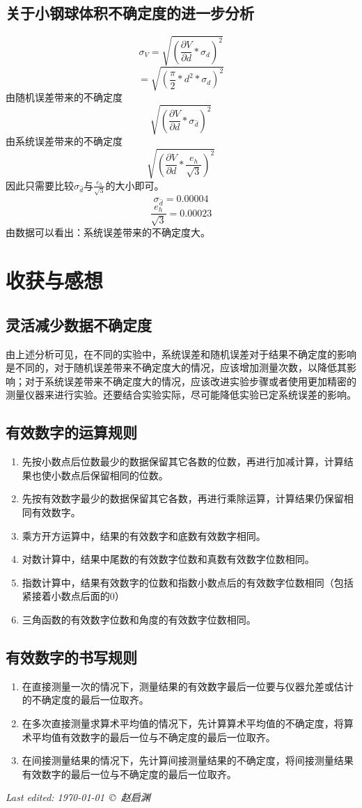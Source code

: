 \documentclass[a4paper,11pt]{article}
\begin{document}
\subsection{关于小钢球体积不确定度的进一步分析}
$$ \sigma_{V} = \sqrt{(\dfrac{\partial V}{\partial d} * \sigma_{d} )^{2} } $$
$$ = \sqrt{(\dfrac{\pi}{2} * d^{2} *\sigma_{d} )^{2} } $$
由随机误差带来的不确定度
$$ \sqrt{(\dfrac{\partial V}{\partial d} * \sigma_{\stackrel{-}{d}})^{2} }  $$
由系统误差带来的不确定度
$$ \sqrt{(\dfrac{\partial V}{\partial d} * \frac{e_{h}}{\sqrt{3}} )^{2} }  $$
因此只需要比较$\sigma_{\stackrel{-}{d}}$与$\frac{e_{h}}{\sqrt{3}}$的大小即可。
$$ \sigma_{\stackrel{-}{d}} = 0.00004 $$
$$ \frac{e_{h}}{\sqrt{3}} = 0.00023 $$
由数据可以看出：系统误差带来的不确定度大。
	
\section{收获与感想}
\subsection{灵活减少数据不确定度}
	由上述分析可见，在不同的实验中，系统误差和随机误差对于结果不确定度的影响是不同的，对于随机误差带来不确定度大的情况，应该增加测量次数，以降低其影响；对于系统误差带来不确定度大的情况，应该改进实验步骤或者使用更加精密的测量仪器来进行实验。还要结合实验实际，尽可能降低实验已定系统误差的影响。
\subsection{有效数字的运算规则}
	\begin{enumerate}
		\item 先按小数点后位数最少的数据保留其它各数的位数，再进行加减计算，计算结果也使小数点后保留相同的位数。
		\item 先按有效数字最少的数据保留其它各数，再进行乘除运算，计算结果仍保留相同有效数字。
		\item 乘方开方运算中，结果的有效数字和底数有效数字相同。
		\item 对数计算中，结果中尾数的有效数字位数和真数有效数字位数相同。
		\item 指数计算中，结果有效数字的位数和指数小数点后的有效数字位数相同（包括紧接着小数点后面的0）
		\item 三角函数的有效数字位数和角度的有效数字位数相同。
	\end{enumerate}

\subsection{有效数字的书写规则}
\begin{enumerate}
	\item 在直接测量一次的情况下，测量结果的有效数字最后一位要与仪器允差或估计的不确定度的最后一位取齐。
	\item 在多次直接测量求算术平均值的情况下，先计算算术平均值的不确定度，将算术平均值有效数字的最后一位与不确定度的最后一位取齐。
	\item 在间接测量结果的情况下，先计算间接测量结果的不确定度，将间接测量结果有效数字的最后一位与不确定度的最后一位取齐。
\end{enumerate}

	\vfill\noindent\itshape\footnotesize
	\hfill Last edited: \today\ \copyright\ 赵启渊
\end{document}
